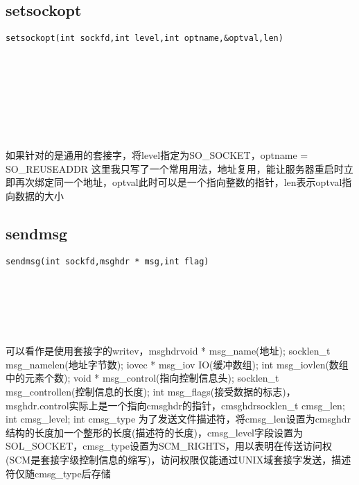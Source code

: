\documentclass[10pt,a4paper]{article}
\begin{document}
\subsection{setsockopt}
\begin{spacing}{2.0}
\lstset{language=C,numbers=none}
\begin{lstlisting}
setsockopt(int sockfd,int level,int optname,&optval,len)
\end{lstlisting}
{\large\color[rgb]{0.2,0.4,0.6}{sockfd:}} \\
{\large\color[rgb]{0.2,0.4,0.6}{level:}} \\
{\large\color[rgb]{0.2,0.4,0.6}{optname:}} \\
{\large\color[rgb]{0.2,0.4,0.6}{\&optval:}} \\
{\large\color[rgb]{0.2,0.4,0.6}{len:}}
\paragraph{ \ \ }如果针对的是通用的套接字，将level指定为SO\_SOCKET，optname = SO\_REUSEADDR 这里我只写了一个常用用法，地址复用，能让服务器重启时立即再次绑定同一个地址，optval此时可以是一个指向整数的指针，len表示optval指向数据的大小
\end{spacing}

\subsection{sendmsg}
\begin{spacing}{2.0}
\lstset{language=C,numbers=none}
\begin{lstlisting}
sendmsg(int sockfd,msghdr * msg,int flag)
\end{lstlisting}
{\large\color[rgb]{0.2,0.4,0.6}{sockfd:}} \\
{\large\color[rgb]{0.2,0.4,0.6}{msg:}} \\
{\large\color[rgb]{0.2,0.4,0.6}{flag:}}
\paragraph{ \ \ }可以看作是使用套接字的writev，msghdr{void * msg\_name(地址); socklen\_t msg\_namelen(地址字节数); iovec * msg\_iov IO(缓冲数组); int msg\_iovlen(数组中的元素个数); void * msg\_control(指向控制信息头); socklen\_t msg\_controllen(控制信息的长度); int msg\_flags(接受数据的标志)}，msghdr.control实际上是一个指向cmsghdr的指针，cmsghdr{socklen\_t cmsg\_len; int cmsg\_level; int cmsg\_type} 为了发送文件描述符，将cmsg\_len设置为cmsghdr结构的长度加一个整形的长度(描述符的长度)，cmsg\_level字段设置为SOL\_SOCKET，cmsg\_type设置为SCM\_RIGHTS，用以表明在传送访问权(SCM是套接字级控制信息的缩写)，访问权限仅能通过UNIX域套接字发送，描述符仅随cmsg\_type后存储
\end{spacing}
\end{document}
